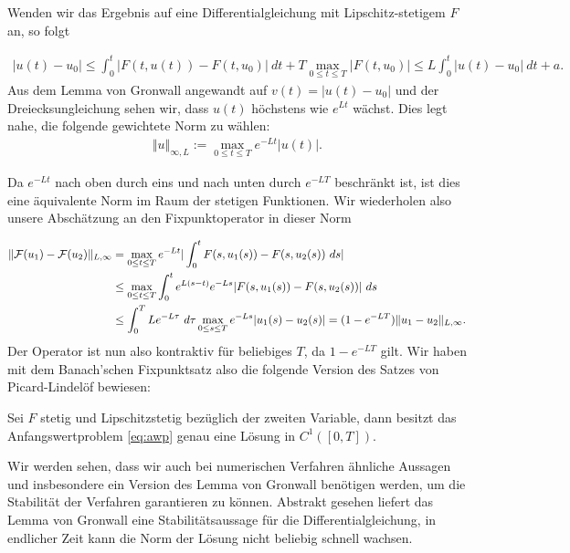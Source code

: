 Wenden wir das Ergebnis auf eine Differentialgleichung mit Lipschitz-stetigem $F$ an, so folgt
 
\begin{align*}
\vert u(t) -u_0 \vert \leq \int_0^t \vert F(t,u(t)) - F(t,u_0) \vert ~dt + T \max_{0 \leq t \leq T} \vert F(t,u_0)\vert \leq L 
\int_0^t \vert u(t) - u_0\vert ~dt + a.
\end{align*}
Aus dem Lemma von Gronwall angewandt auf $v(t) = \vert u(t) - u_0 \vert$ und der Dreiecksungleichung sehen wir, dass $u(t)$ höchstens wie $e^{Lt}$ wächst. Dies legt nahe, die folgende gewichtete Norm zu wählen:
\begin{align*}
\Vert u \Vert_{\infty,L} := \max_{0 \leq t \leq T} e^{-Lt} \vert u(t) \vert.
\end{align*}

Da $e^{-Lt}$ nach oben durch eins und nach unten durch $e^{-LT}$ beschränkt ist, ist dies eine äquivalente Norm im Raum der stetigen Funktionen. Wir wiederholen also unsere Abschätzung an den Fixpunktoperator in dieser Norm

 \begin{align*} 
\Vert {\cal F}(u_1) - {\cal F}(u_2) \Vert_{L,\infty} &= \max_{0 \leq t \leq T}  e^{-Lt}\vert \int_0^t F(s,u_1(s)) - F(s,u_2(s)) ~ds \vert \\
&\leq  \max_{0 \leq t \leq T} \int_0^t e^{L(s-t)} e^{-Ls} \vert  F(s,u_1(s)) - F(s,u_2(s))\vert  ~ds  \\ &\leq  \int_0^T L e^{-L\tau}~d\tau  \max_{0 \leq s \leq T}  e^{-Ls} \vert u_1(s) - u_2(s) \vert = (1-e^{-LT}) \Vert u_1 - u_2 \Vert_{L,\infty}. 
\end{align*}
Der Operator ist nun also kontraktiv für beliebiges $T$, da $1- e^{-LT}$ gilt. Wir haben mit dem Banach'schen Fixpunktsatz also die folgende Version des Satzes von Picard-Lindelöf bewiesen:

\begin{theorem}{}{}
Sei $F$ stetig und Lipschitzstetig bezüglich der zweiten Variable, dann besitzt das Anfangswertproblem \eqref{eq:awp} genau eine Lösung in $C^1([0,T])$. 
\end{theorem}

Wir werden sehen, dass wir auch bei numerischen Verfahren ähnliche Aussagen und insbesondere ein Version des Lemma von Gronwall  benötigen werden, um die Stabilität der Verfahren garantieren zu können. Abstrakt gesehen liefert das Lemma von Gronwall eine Stabilitätsaussage für die Differentialgleichung, in endlicher Zeit kann die Norm der Lösung nicht beliebig schnell wachsen. 

